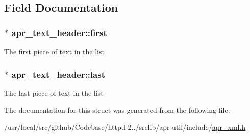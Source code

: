 \subsection{Field Documentation}
\subsubsection[{\texorpdfstring{first}{first}}]{$\ast$ apr\+\_\+text\+\_\+header\+::first}\hypertarget{structapr__text__header_a6db03d272f5e56058c84e10e49624c0b}{}\label{structapr__text__header_a6db03d272f5e56058c84e10e49624c0b}
The first piece of text in the list 
\subsubsection[{\texorpdfstring{last}{last}}]{$\ast$ apr\+\_\+text\+\_\+header\+::last}\hypertarget{structapr__text__header_a3ebe57b46d323b8cefaba1e114acf09e}{}\label{structapr__text__header_a3ebe57b46d323b8cefaba1e114acf09e}
The last piece of text in the list 

The documentation for this struct was generated from the following file\+:\begin{DoxyCompactItemize}
\item 
/usr/local/src/github/\+Codebase/httpd-\/2../srclib/apr-\/util/include/\hyperlink{apr__xml_8h}{apr\+\_\+xml.\+h}\end{DoxyCompactItemize}
